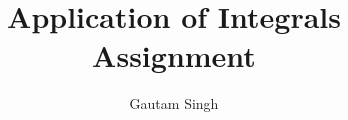 \documentclass[journal,12pt,twocolumn]{IEEEtran}
\DeclareMathOperator*{\Res}{Res}
\begin{document}
\newtheorem{theorem}{Theorem}[section]
\newtheorem{problem}{Problem}
\newtheorem{proposition}{Proposition}[section]
\newtheorem{lemma}{Lemma}[section]
\newtheorem{corollary}[theorem]{Corollary}
\newtheorem{example}{Example}[section]
\newtheorem{definition}[problem]{Definition}
\newcommand{\BEQA}{\begin{eqnarray}}
\newcommand{\EEQA}{\end{eqnarray}}
\newcommand{\define}{\stackrel{\triangle}{=}}

\providecommand{\mbf}{\mathbf}
\providecommand{\pr}[1]{\ensuremath{\Pr\left(#1\right)}}
\providecommand{\qfunc}[1]{\ensuremath{Q\left(#1\right)}}
\providecommand{\sbrak}[1]{\ensuremath{{}\left[#1\right]}}
\providecommand{\lsbrak}[1]{\ensuremath{{}\left[#1\right.}}
\providecommand{\rsbrak}[1]{\ensuremath{{}\left.#1\right]}}
\providecommand{\brak}[1]{\ensuremath{\left(#1\right)}}
\providecommand{\lbrak}[1]{\ensuremath{\left(#1\right.}}
\providecommand{\rbrak}[1]{\ensuremath{\left.#1\right)}}
\providecommand{\cbrak}[1]{\ensuremath{\left\{#1\right\}}}
\providecommand{\lcbrak}[1]{\ensuremath{\left\{#1\right.}}
\providecommand{\rcbrak}[1]{\ensuremath{\left.#1\right\}}}
\theoremstyle{remark}
\newtheorem{rem}{Remark}
\newcommand{\sgn}{\mathop{\mathrm{sgn}}}
\providecommand{\abs}[1]{\left\vert#1\right\vert}
\providecommand{\res}[1]{\Res\displaylimits_{#1}} 
\providecommand{\norm}[1]{\left\lVert#1\right\rVert}
\providecommand{\mtx}[1]{\mathbf{#1}}
\providecommand{\mean}[1]{E\left[ #1 \right]}
\providecommand{\fourier}{\overset{\mathcal{F}}{ \rightleftharpoons}}
\providecommand{\system}[1]{\overset{\mathcal{#1}}{ \longleftrightarrow}}
\newcommand{\solution}{\noindent \textbf{Solution: }}
\newcommand{\cosec}{\,\text{cosec}\,}
\providecommand{\dec}[2]{\ensuremath{\overset{#1}{\underset{#2}{\gtrless}}}}
\newcommand{\myvec}[1]{\ensuremath{\begin{pmatrix}#1\end{pmatrix}}}
\newcommand{\mydet}[1]{\ensuremath{\begin{vmatrix}#1\end{vmatrix}}}
\let\vec\mathbf
\def\putbox#1#2#3{\makebox[0in][l]{\makebox[#1][l]{}\raisebox{\baselineskip}[0in][0in]{\raisebox{#2}[0in][0in]{#3}}}}
     \def\rightbox#1{\makebox[0in][r]{#1}}
     \def\centbox#1{\makebox[0in]{#1}}
     \def\topbox#1{\raisebox{-\baselineskip}[0in][0in]{#1}}
     \def\midbox#1{\raisebox{-0.5\baselineskip}[0in][0in]{#1}}

\vspace{3cm}
\title{Application of Integrals Assignment}
\author{Gautam Singh}
\maketitle
\bigskip
\end{document}
